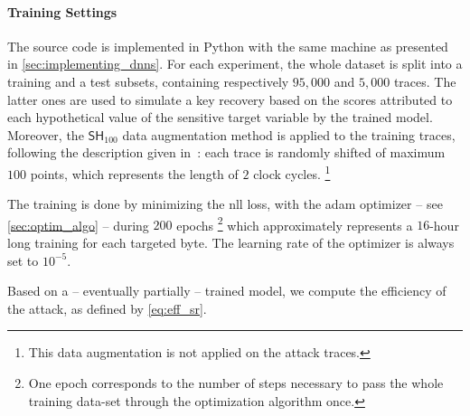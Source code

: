 \paragraph{Training Settings}
The source code is implemented in \textsf{Python} with the same machine as presented in \autoref{sec:implementing_dnns}.
For each experiment, the whole dataset is split into a training and a test subsets, containing respectively \(95,000\) and \(5,000\) traces.
The latter ones are used to simulate a key recovery based on the scores attributed to each hypothetical value of the sensitive target variable by the trained model.
Moreover, the \(\mathsf{SH}_{100}\) data augmentation method is applied to the
training traces, following the description given in~\cite{cagli_convolutional_2017}:
each trace is randomly shifted of maximum \(100\) points, which represents the length of \(2\) clock cycles.%
\footnote{
	This data augmentation is not applied on the attack traces.
}

The training is done by minimizing the \gls{nll} loss, with the \gls{adam} optimizer -- see \autoref{sec:optim_algo} -- during \(200\) epochs%
\footnote{
	One epoch corresponds to the number of steps necessary to pass the whole training data-set through the optimization algorithm once.
}
which approximately represents a \(16\)-hour long training for each targeted byte.
The learning rate of the optimizer is always set to \(10^{-5}\).

Based on a -- eventually partially -- trained model, we compute the efficiency of the attack, as defined by \autoref{eq:eff_sr}.
